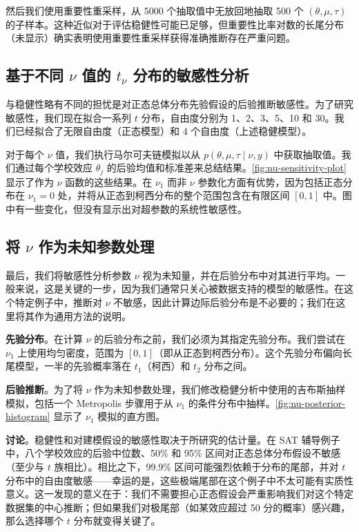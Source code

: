 然后我们使用重要性重采样，从 5000 个抽取值中无放回地抽取 500 个 $(\theta, \mu, \tau)$ 的子样本。这种近似对于评估稳健性可能已足够，但重要性比率对数的长尾分布（未显示）确实表明使用重要性重采样获得准确推断存在严重问题。

\subsection{基于不同 $\nu$ 值的 $t_\nu$ 分布的敏感性分析}

与稳健性略有不同的担忧是对正态总体分布先验假设的后验推断敏感性。为了研究敏感性，我们现在拟合一系列 $t$ 分布，自由度分别为 1、2、3、5、10 和 30。我们已经拟合了无限自由度（正态模型）和 4 个自由度（上述稳健模型）。

对于每个 $\nu$ 值，我们执行马尔可夫链模拟以从 $p(\theta, \mu, \tau \mid \nu, y)$ 中获取抽取值。我们通过每个学校效应 $\theta_j$ 的后验均值和标准差来总结结果。\cref{fig:nu-sensitivity-plot} 显示了作为 $\nu$ 函数的这些结果。在 $\nu_1$ 而非 $\nu$ 参数化方面有优势，因为包括正态分布在 $\nu_1 = 0$ 处，并将从正态到柯西分布的整个范围包含在有限区间 $[0, 1]$ 中。图中有一些变化，但没有显示出对超参数的系统性敏感性。

\subsection{将 $\nu$ 作为未知参数处理}

最后，我们将敏感性分析参数 $\nu$ 视为未知量，并在后验分布中对其进行平均。一般来说，这是关键的一步，因为我们通常只关心被数据支持的模型的敏感性。在这个特定例子中，推断对 $\nu$ 不敏感，因此计算边际后验分布是不必要的；我们在这里将其作为通用方法的说明。

\textbf{先验分布}。在计算 $\nu$ 的后验分布之前，我们必须为其指定先验分布。我们尝试在 $\nu_1$ 上使用均匀密度，范围为 $[0, 1]$（即从正态到柯西分布）。这个先验分布偏向长尾模型，一半的先验概率落在 $t_1$（柯西）和 $t_2$ 分布之间。

\textbf{后验推断}。为了将 $\nu$ 作为未知参数处理，我们修改稳健分析中使用的吉布斯抽样模拟，包括一个 Metropolis 步骤用于从 $\nu_1$ 的条件分布中抽样。\cref{fig:nu-posterior-histogram} 显示了 $\nu_1$ 模拟的直方图。

\textbf{讨论}。稳健性和对建模假设的敏感性取决于所研究的估计量。在 SAT 辅导例子中，八个学校效应的后验中位数、50\% 和 95\% 区间对正态总体分布假设不敏感（至少与 $t$ 族相比）。相比之下，99.9\% 区间可能强烈依赖于分布的尾部，并对 $t$ 分布中的自由度敏感——幸运的是，这些极端尾部在这个例子中不太可能有实质性意义。这一发现的意义在于：我们不需要担心正态假设会严重影响我们对这个特定数据集的中心推断；但如果我们对极尾部（如某效应超过 50 分的概率）感兴趣，那么选择哪个 $t$ 分布就变得关键了。


